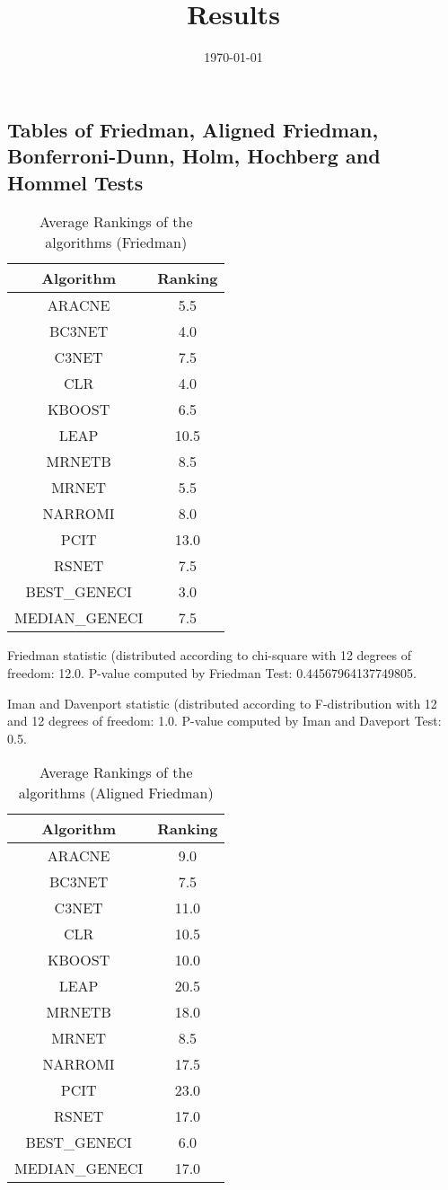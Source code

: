 \documentclass[a4paper,10pt]{article}
\title{Results}
\author{}
\date{\today}
\begin{document}
\begin{landscape}
\oddsidemargin 0in \topmargin 0in\maketitle
\section{Tables of Friedman, Aligned Friedman, Bonferroni-Dunn, Holm, Hochberg and Hommel Tests}
\begin{table}[!htp]
\centering
\caption{Average Rankings of the algorithms (Friedman)
}\begin{tabular}{c|c}
Algorithm&Ranking\\
\hline
ARACNE&5.5\\
BC3NET&4.0\\
C3NET&7.5\\
CLR&4.0\\
KBOOST&6.5\\
LEAP&10.5\\
MRNETB&8.5\\
MRNET&5.5\\
NARROMI&8.0\\
PCIT&13.0\\
RSNET&7.5\\
BEST_GENECI&3.0\\
MEDIAN_GENECI&7.5\\
\end{tabular}
\end{table}


Friedman statistic (distributed according to chi-square with 12 degrees of freedom: 12.0. 
P-value computed by Friedman Test: 0.44567964137749805.\newline

Iman and Davenport statistic (distributed according to F-distribution with 12 and 12 degrees of freedom: 1.0. 
P-value computed by Iman and Daveport Test: 0.5.\newline


\newpage

\begin{table}[!htp]
\centering
\caption{Average Rankings of the algorithms (Aligned Friedman)
}\begin{tabular}{c|c}
Algorithm&Ranking\\
\hline
ARACNE&9.0\\
BC3NET&7.5\\
C3NET&11.0\\
CLR&10.5\\
KBOOST&10.0\\
LEAP&20.5\\
MRNETB&18.0\\
MRNET&8.5\\
NARROMI&17.5\\
PCIT&23.0\\
RSNET&17.0\\
BEST_GENECI&6.0\\
MEDIAN_GENECI&17.0\\
\end{tabular}
\end{table}



\end{landscape}
\end{document}
